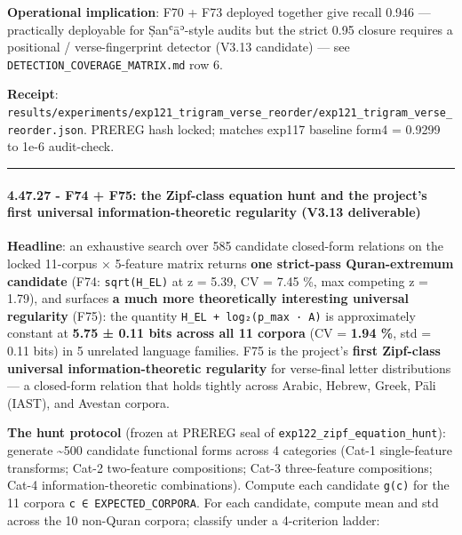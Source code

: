 \documentclass[
]{article}
\begin{document}
\textbf{Operational implication}: F70 + F73 deployed together give
recall 0.946 --- practically deployable for Ṣanʿāʾ-style audits but the
strict 0.95 closure requires a positional / verse-fingerprint detector
(V3.13 candidate) --- see \texttt{DETECTION\_COVERAGE\_MATRIX.md} row 6.

\textbf{Receipt}:
\texttt{results/experiments/exp121\_trigram\_verse\_reorder/exp121\_trigram\_verse\_reorder.json}.
PREREG hash locked; matches exp117 baseline form4 = 0.9299 to 1e-6
audit-check.

\begin{center}\rule{0.5\linewidth}{0.5pt}\end{center}

\paragraph{4.47.27 - F74 + F75: the Zipf-class equation hunt and the
project's first universal information-theoretic regularity (V3.13
deliverable)}\label{f74-f75-the-zipf-class-equation-hunt-and-the-projects-first-universal-information-theoretic-regularity-v3.13-deliverable}

\textbf{Headline}: an exhaustive search over 585 candidate closed-form
relations on the locked 11-corpus × 5-feature matrix returns \textbf{one
strict-pass Quran-extremum candidate} (F74: \texttt{sqrt(H\_EL)} at
\textbar z\textbar{} = 5.39, CV = 7.45 \%, max competing
\textbar z\textbar{} = 1.79), and surfaces \textbf{a much more
theoretically interesting universal regularity} (F75): the quantity
\texttt{H\_EL\ +\ log₂(p\_max\ ·\ A)} is approximately constant at
\textbf{5.75 ± 0.11 bits across all 11 corpora} (CV = \textbf{1.94 \%},
std = 0.11 bits) in 5 unrelated language families. F75 is the project's
\textbf{first Zipf-class universal information-theoretic regularity} for
verse-final letter distributions --- a closed-form relation that holds
tightly across Arabic, Hebrew, Greek, Pāli (IAST), and Avestan corpora.

\textbf{The hunt protocol} (frozen at PREREG seal of
\texttt{exp122\_zipf\_equation\_hunt}): generate \textasciitilde500
candidate functional forms across 4 categories (Cat-1 single-feature
transforms; Cat-2 two-feature compositions; Cat-3 three-feature
compositions; Cat-4 information-theoretic combinations). Compute each
candidate \texttt{g(c)} for the 11 corpora
\texttt{c\ ∈\ EXPECTED\_CORPORA}. For each candidate, compute mean and
std across the 10 non-Quran corpora; classify under a 4-criterion
ladder:
\end{document}
